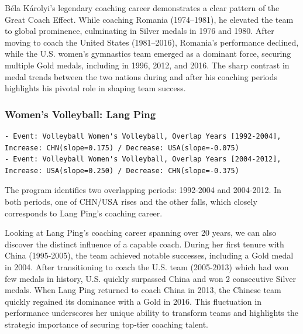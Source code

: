 \documentclass{mcmthesis}
\begin{document}
Béla Károlyi's legendary coaching career demonstrates a clear pattern of the Great Coach Effect. While coaching Romania (1974–1981), he elevated the team to global prominence, culminating in Silver medals in 1976 and 1980. After moving to coach the United States (1981–2016), Romania's performance declined, while the U.S. women's gymnastics team emerged as a dominant force, securing multiple Gold medals, including in 1996, 2012, and 2016. The sharp contrast in medal trends between the two nations during and after his coaching periods highlights his pivotal role in shaping team success.

\subsubsection{Women's Volleyball: Lang Ping}
\begin{lstlisting}
- Event: Volleyball Women's Volleyball, Overlap Years [1992-2004], Increase: CHN(slope=0.175) / Decrease: USA(slope=-0.075)
- Event: Volleyball Women's Volleyball, Overlap Years [2004-2012], Increase: USA(slope=0.250) / Decrease: CHN(slope=-0.375)
\end{lstlisting}

The program identifies two overlapping periods: 1992-2004 and 2004-2012. In both periods, one of CHN/USA rises and the other falls, which closely corresponds to Lang Ping's coaching career.

Looking at Lang Ping's coaching career spanning over 20 years, we can also discover the distinct influence of a capable coach. During her first tenure with China (1995-2005), the team achieved notable successes, including a Gold medal in 2004. After transitioning to coach the U.S. team (2005-2013) which had won few medals in history, U.S. quickly surpassed China and won 2 consecutive Silver medals. When Lang Ping returned to coach China in 2013, the Chinese team quickly regained its dominance with a Gold in 2016. This fluctuation in performance underscores her unique ability to transform teams and highlights the strategic importance of securing top-tier coaching talent.

\end{document}
